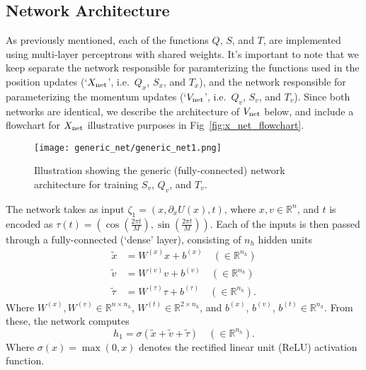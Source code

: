 \documentclass[../main.tex]{subfiles}
\begin{document}
\subsection{Network Architecture}%
\label{subsec:l2hmc_network}
As previously mentioned, each of the functions $Q$, $S$, and $T$, are implemented using multi-layer perceptrons with
shared weights.
%
It's important to note that we keep separate the network responsible for paramterizing the functions used in the
position updates (`${X_{\mathrm{net}}}$', i.e.\ $Q_x$, $S_x$, and $T_x$), and the network responsible for parameterizing the
momentum updates (`${V_{\mathrm{net}}}$', i.e.\ $Q_v$, $S_v$, and $T_v$).
%
Since both networks are identical, we describe the architecture of ${V_{\mathrm{net}}}$ below, and include a flowchart for ${X_{\mathrm{net}}}$ 
illustrative purposes in Fig~\ref{fig:x_net_flowchart}.
%
%
\begin{figure}[htpb]
  \centering
  \texttt{[image: generic\_net/generic\_net1.png]}
  \caption{Illustration showing the generic (fully-connected) network architecture for training $S_v$, $Q_v$, and
  $T_v$.}%
\label{fig:generic_net}
\end{figure}
%
%
%
The network takes as input $\zeta_1 = (x, \partial_{x} U(x), t)$, where $x, v \in \mathbb{R}^{n}$, and $t$ is encoded
as $\tau(t) = \left(\cos{(\frac{2\pi t}{M})},\right.  \left.\sin{(\frac{2\pi t}{M})}\right)$.
%
Each of the inputs is then passed through a fully-connected (`dense' layer), consisting of $n_h$ hidden units
%
\begin{align}
    \tilde x &= W^{(x)} x + b^{(x)} \quad (\in \mathbb{R}^{n_h})\\
    \tilde v &= W^{(v)} v + b^{(v)} \quad (\in \mathbb{R}^{n_h})\\
    \tilde \tau &= W^{(\tau)} \tau + b^{(\tau)} \quad (\in \mathbb{R}^{n_h}).
\end{align}
%
Where $W^{(x)}, W^{(v)} \in \mathbb{R}^{n \times n_h}$, $W^{(t)} \in \mathbb{R}^{2 \times n_h}$, and $b^{(x)}$,
$b^{(v)}$,  $b^{(t)} \in \mathbb{R}^{n_h}$.
%
From these, the network computes
%
\begin{equation}
    h_1 = \sigma(\tilde x + \tilde v + \tilde \tau) \quad (\in
    \mathbb{R}^{n_h}).
    \label{eq:hidden_1}
\end{equation}
%
Where $\sigma(x) = \max(0, x)$ denotes the rectified linear unit (ReLU) activation function.
\end{document}
